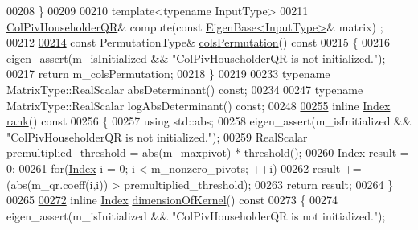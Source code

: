 \begin{DoxyCode}
00208     \}
00209 
00210     \textcolor{keyword}{template}<\textcolor{keyword}{typename} InputType>
00211     \hyperlink{group___q_r___module_class_eigen_1_1_col_piv_householder_q_r}{ColPivHouseholderQR}& compute(\textcolor{keyword}{const} \hyperlink{group___core___module_struct_eigen_1_1_eigen_base}{EigenBase<InputType>}& matrix)
      ;
00212 
\hyperlink{group___q_r___module_ab6ad43e6a6fb75726eae0d5499948f4a}{00214}     \textcolor{keyword}{const} PermutationType& \hyperlink{group___q_r___module_ab6ad43e6a6fb75726eae0d5499948f4a}{colsPermutation}()\textcolor{keyword}{ const}
00215 \textcolor{keyword}{    }\{
00216       eigen\_assert(m\_isInitialized && \textcolor{stringliteral}{"ColPivHouseholderQR is not initialized."});
00217       \textcolor{keywordflow}{return} m\_colsPermutation;
00218     \}
00219 
00233     \textcolor{keyword}{typename} MatrixType::RealScalar absDeterminant() \textcolor{keyword}{const};
00234 
00247     \textcolor{keyword}{typename} MatrixType::RealScalar logAbsDeterminant() \textcolor{keyword}{const};
00248 
\hyperlink{group___q_r___module_a2a59aaa689613ce5ef0c9130ad33940e}{00255}     \textcolor{keyword}{inline} \hyperlink{namespace_eigen_a62e77e0933482dafde8fe197d9a2cfde}{Index} \hyperlink{group___q_r___module_a2a59aaa689613ce5ef0c9130ad33940e}{rank}()\textcolor{keyword}{ const}
00256 \textcolor{keyword}{    }\{
00257       \textcolor{keyword}{using} std::abs;
00258       eigen\_assert(m\_isInitialized && \textcolor{stringliteral}{"ColPivHouseholderQR is not initialized."});
00259       RealScalar premultiplied\_threshold = abs(m\_maxpivot) * threshold();
00260       \hyperlink{namespace_eigen_a62e77e0933482dafde8fe197d9a2cfde}{Index} result = 0;
00261       \textcolor{keywordflow}{for}(\hyperlink{namespace_eigen_a62e77e0933482dafde8fe197d9a2cfde}{Index} i = 0; i < m\_nonzero\_pivots; ++i)
00262         result += (abs(m\_qr.coeff(i,i)) > premultiplied\_threshold);
00263       \textcolor{keywordflow}{return} result;
00264     \}
00265 
\hyperlink{group___q_r___module_a7c9294565d179226133770160b827be1}{00272}     \textcolor{keyword}{inline} \hyperlink{namespace_eigen_a62e77e0933482dafde8fe197d9a2cfde}{Index} \hyperlink{group___q_r___module_a7c9294565d179226133770160b827be1}{dimensionOfKernel}()\textcolor{keyword}{ const}
00273 \textcolor{keyword}{    }\{
00274       eigen\_assert(m\_isInitialized && \textcolor{stringliteral}{"ColPivHouseholderQR is not initialized."});

\end{DoxyCode}

